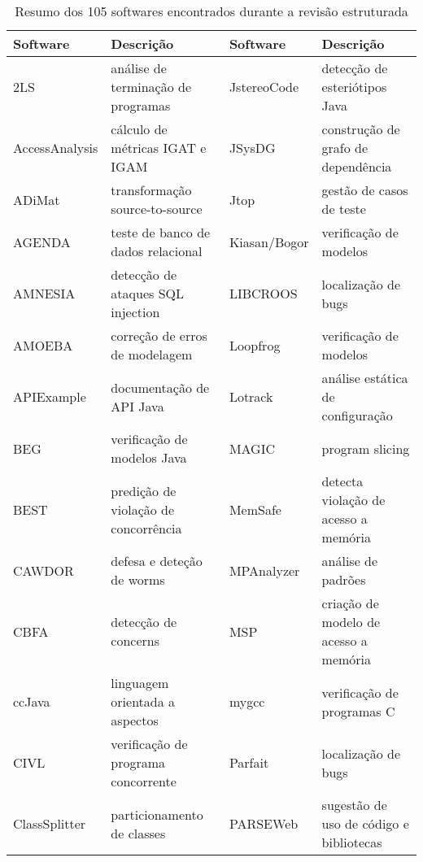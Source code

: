 \begin{table}[h]
{\scriptsize
\caption{Resumo dos 105 softwares encontrados durante a revisão estruturada}
\centering
\begin{tabular}{| l | l | l | l |}
  \hline
  Software       & Descrição                            & Software         & Descrição                            \\
  \hline
  2LS            & análise de terminação de programas   & JstereoCode      & detecção de esteriótipos Java        \\
  AccessAnalysis & cálculo de métricas IGAT e IGAM      & JSysDG           & construção de grafo de dependência   \\
  ADiMat         & transformação source-to-source       & Jtop             & gestão de casos de teste             \\
  AGENDA         & teste de banco de dados relacional   & Kiasan/Bogor     & verificação de modelos               \\
  AMNESIA        & detecção de ataques SQL injection    & LIBCROOS         & localização de bugs                  \\
  AMOEBA         & correção de erros de modelagem       & Loopfrog         & verificação de modelos               \\
  APIExample     & documentação de API Java             & Lotrack          & análise estática de configuração     \\
  BEG            & verificação de modelos Java          & MAGIC            & program slicing                      \\
  BEST           & predição de violação de concorrência & MemSafe          & detecta violação de acesso a memória \\
  CAWDOR         & defesa e deteção de worms            & MPAnalyzer       & análise de padrões                   \\
  CBFA           & detecção de concerns                 & MSP              & criação de modelo de acesso a memória \\
  ccJava         & linguagem orientada a aspectos       & mygcc            & verificação de programas C           \\
  CIVL           & verificação de programa concorrente  & Parfait          & localização de bugs                  \\
  ClassSplitter  & particionamento de classes           & PARSEWeb         & sugestão de uso de código e bibliotecas \\

\end{tabular}}
\end{table}

